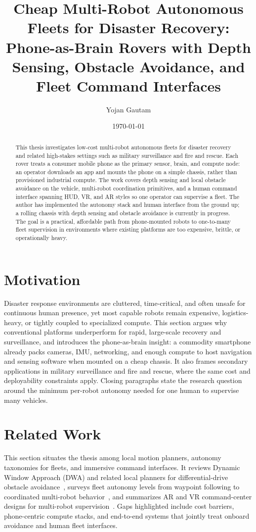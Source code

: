 \documentclass[11pt,a4paper]{article}
\title{Cheap Multi-Robot Autonomous Fleets for Disaster Recovery:\\
Phone-as-Brain Rovers with Depth Sensing, Obstacle Avoidance, and Fleet Command Interfaces}
\author{Yojan Gautam}
\date{\today}
\begin{document}
\maketitle

\begin{abstract}
This thesis investigates low-cost multi-robot autonomous fleets for disaster recovery and related high-stakes settings such as military surveillance and fire and rescue.
Each rover treats a consumer mobile phone as the primary sensor, brain, and compute node: an operator downloads an app and mounts the phone on a simple chassis, rather than provisioned industrial compute.
The work covers depth sensing and local obstacle avoidance on the vehicle, multi-robot coordination primitives, and a human command interface spanning HUD, VR, and AR styles so one operator can supervise a fleet.
The author has implemented the autonomy stack and human interface from the ground up; a rolling chassis with depth sensing and obstacle avoidance is currently in progress.
The goal is a practical, affordable path from phone-mounted robots to one-to-many fleet supervision in environments where existing platforms are too expensive, brittle, or operationally heavy.
\end{abstract}

\tableofcontents
\newpage

\section{Motivation}
\label{sec:motivation}
Disaster response environments are cluttered, time-critical, and often unsafe for continuous human presence, yet most capable robots remain expensive, logistics-heavy, or tightly coupled to specialized compute.
This section argues why conventional platforms underperform for rapid, large-scale recovery and surveillance, and introduces the phone-as-brain insight: a commodity smartphone already packs cameras, IMU, networking, and enough compute to host navigation and sensing software when mounted on a cheap chassis.
It also frames secondary applications in military surveillance and fire and rescue, where the same cost and deployability constraints apply.
Closing paragraphs state the research question around the minimum per-robot autonomy needed for one human to supervise many vehicles.

\section{Related Work}
\label{sec:related}
This section situates the thesis among local motion planners, autonomy taxonomies for fleets, and immersive command interfaces.
It reviews Dynamic Window Approach (DWA) and related local planners for differential-drive obstacle avoidance~\citep{fox1997dwa}, surveys fleet autonomy levels from waypoint following to coordinated multi-robot behavior~\citep{parker1998alliance,dias2006market}, and summarizes AR and VR command-center designs for multi-robot supervision~\citep{chen2018survey,milgram1994continuum}.
Gaps highlighted include cost barriers, phone-centric compute stacks, and end-to-end systems that jointly treat onboard avoidance and human fleet interfaces.
\end{document}
